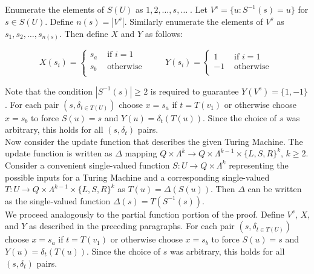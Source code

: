 \documentclass[11pt]{article}
\begin{document}

Enumerate the elements of $ S(U) $ as $ 1, 2, \dots, s, \dots \; $. Let $ V^s = \{u : S^{-1}(s) = u \} $ for $ s \in S(U) $. Define $ n(s) = |V^s| $. Similarly enumerate the elements of $ V^s $ as $ s_1, s_2, \dots , s_{n(s)}$. Then define $ X $ and $ Y $ as follows:

\begin{equation*}
X(s_i) = \begin{cases}
       s_a & \text{ if } i = 1 \\
       s_b & \text{ otherwise } \\
       \end{cases} \quad \quad 
Y(s_i) = \begin{cases}
       1 & \text{ if } i = 1 \\
       -1 & \text{ otherwise } \\
       \end{cases} 
\end{equation*}

\bigskip
Note that the condition $ |S^{-1}(s)| \geq 2 $ is required to guarantee $ Y(V^s) = \{1, -1\} $. For each pair $ (s, \delta_{t \in T(U)} ) $ choose $ x = s_a $ if $ t = T(v_1) $ or otherwise choose $ x = s_b $ to force $ S(u) = s $ and $ Y(u) = \delta_{t}(T(u)) $. Since the choice of $ s $ was arbitrary, this holds for all $ (s, \delta_t) $ pairs. \\

Now consider the update function that describes the given Turing Machine. The update function is written as $ \Delta $ mapping $ Q \times \Lambda^{k} \rightarrow Q \times \Lambda^{k - 1} \times \{ L, S, R \} ^{k} $, $ k \geq 2 $. Consider a convenient single-valued function $ S: U \rightarrow Q \times \Lambda^{k} $ representing the possible inputs for a Turing Machine and a corresponding single-valued $ T: U \rightarrow Q \times \Lambda^{k - 1} \times \{ L, S, R \}^ {k} $ as $ T(u) = \Delta(S(u)) $. Then $ \Delta $ can be written as the single-valued function $ \Delta(s) = T(S^{-1}(s)). $ \\

We proceed analogously to the partial function portion of the proof. Define $ V^s $, $ X $, and $ Y $ as described in the preceding paragraphs. For each pair $ (s, \delta_{t \in T(U)} ) $ choose $ x = s_a $ if $ t = T(v_1) $ or otherwise choose $ x = s_b $ to force $ S(u) = s $ and $ Y(u) = \delta_{t}(T(u)) $. Since the choice of $ s $ was arbitrary, this holds for all $ (s, \delta_t) $ pairs. \\
\end{document}
